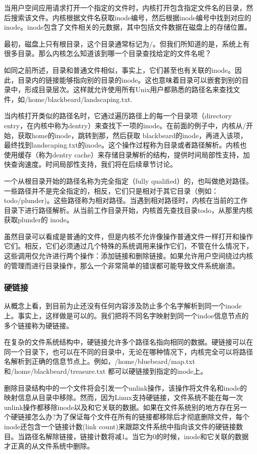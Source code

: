当用户空间应用请求打开一个指定的文件时，内核打开包含指定文件名的目录，然后搜索该文件。内核根据文件名获取inode编号，然后根据inode编号中找到对应的inode。inode包含了文件相关的元数据，其中包括文件数据在磁盘上的存储位置。


最初，磁盘上只有根目录，这个目录通常标记为/。但我们所知道的是，系统上有很多目录。那么内核怎么知道该到哪一个目录查找给定的文件名呢？

如同之前所述，目录和普通文件相似，事实上，它们甚至也有关联的inode。因此，目录内的链接能够指向别的目录的inode。这也意味着目录可以嵌套到别的目录中，形成目录层次。这样就允许使用所有Unix用户都熟悉的路径名来查找文件，如/home/blackbeard/landscaping.txt.

当内核打开类似的路径名时，它通过遍历路径上的每一个目录项（directory entry，在内核中称为dentry）来查找下一项的inode。在前面的例子中，内核从/开始，获取home的inode，跳转到那，然后获取 blackbeard的inode，再进入该项，最终找到landscaping.txt的inode。这个操作过程称为目录或者路径解析。内核也使用缓存（称为dentry cache）来存储目录解析的结构，提供时间局部性支持，加快查询速度。时间局部性支持，我们将在后续章节讨论。

一个从根目录开始的路径名称为完全指定（fully qualified）的，也叫做绝对路径。一些路径并不是完全指定的，相反，它们只是相对于其它目录（例如：todo/plunder)。这些路径称为相对路径。当遇到相对路径时，内核在当前的工作目录下进行路径解析。从当前工作目录开始，内核首先查找目录todo，从那里内核获取plunder的 inode。

虽然目录可以看成是普通的文件，但是内核不允许像操作普通文件一样打开和操作它们。相反，它们必须通过几个特殊的系统调用来操作它们，不管在什么情况下，这些调用仅允许进行两个操作：添加链接和删除链接。如果允许用户空间绕过内核的管理而进行目录操作，那么一个非常简单的错误都可能导致文件系统崩溃。

\subsubsection{硬链接}

从概念上看，到目前为止还没有任何内容涉及防止多个名字解析到同一个inode上。事实上，这样做是可以的。我们把将不同名字映射到同一个indoe信息节点的多个链接称为硬链接。

在复杂的文件系统结构中，硬链接允许多个路径名指向相同的数据。硬链接可以在同一个目录下，也可以在不同的目录中，无论在哪种情况下，内核完全可以将路径名解析到正确的信息节点上。例如，/home/bluebeard/map.txt 和/home/blackbeard/treasure.txt 都可以硬链接到指定的inode上。

删除目录结构中的一个文件将会引发一个unlink操作，该操作将文件名和inode的映射信息从目录中移除。然而，因为Linux支持硬链接，文件系统不能在每一次unlink操作都移除inode以及和它关联的数据。如果在文件系统别的地方存在另一个硬链接怎么办?为了保证每个文件在所有的链接都移除后才彻底删除文件，每个inode还包含一个链接计数(link count)来跟踪文件系统中指向该文件的硬链接数目。当路径名解除链接，链接计数将减1。当它为0的时候，inode和它关联的数据才正真的从文件系统中删除。


